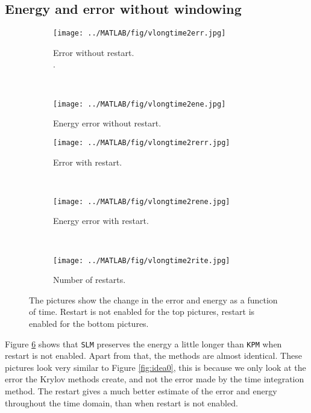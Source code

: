 \subsection{Energy and error without windowing} %
\begin{figure}[H]
        \centering
        \begin{subfigure}[b]{0.3\textwidth}
                \texttt{[image: ../MATLAB/fig/vlongtime2err.jpg]}
                \caption{ Error without restart.\\. }
                \label{fig:vlongtime2err}
        \end{subfigure}
        ~
        \begin{subfigure}[b]{0.3\textwidth}
                \texttt{[image: ../MATLAB/fig/vlongtime2ene.jpg]}
                \caption{ Energy error without restart. }
                \label{fig:vlongtime8err}
        \end{subfigure}

        \begin{subfigure}[b]{0.3\textwidth}
                \texttt{[image: ../MATLAB/fig/vlongtime2rerr.jpg]}
                \caption{ Error with restart. }
                \label{fig:vlongtime2rerr}
        \end{subfigure}
        ~
        \begin{subfigure}[b]{0.3\textwidth}
                \texttt{[image: ../MATLAB/fig/vlongtime2rene.jpg]}
                \caption{ Energy error with restart. }
                \label{fig:vlongtime8rerr}
        \end{subfigure}
     	~
        \begin{subfigure}[b]{0.3\textwidth}
                \texttt{[image: ../MATLAB/fig/vlongtime2rite.jpg]}
                \caption{ Number of restarts. }
                \label{fig:vlongtime2rene}
        \end{subfigure}        
        
        \caption{ The pictures show the change in the error and energy as a function of time.  Restart is not enabled for the top pictures, restart is enabled for the bottom pictures. }
        \label{fig:vSLMenergyerror1}
\end{figure}
Figure \ref{fig:vSLMenergyerror1} shows that \texttt{SLM} preserves the energy a little longer than \texttt{KPM} when restart is not enabled. Apart from that, the methods are almost identical. These pictures look very similar to Figure \ref{fig:idea0}, this is because we only look at the error the Krylov methods create, and not the error made by the time integration method. The restart gives a much better estimate of the error and energy throughout the time domain, than when restart is not enabled. \\

